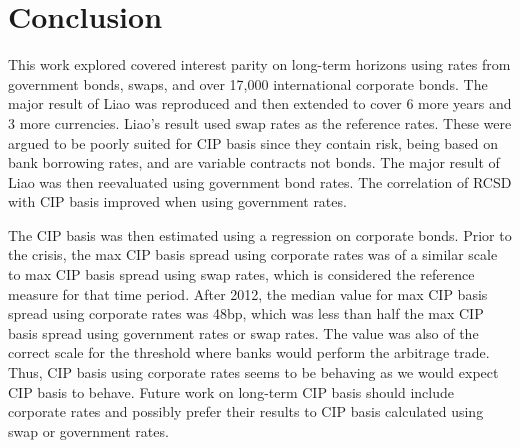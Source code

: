 


\section{Conclusion} \label{conclusion_chapter}

This work explored covered interest parity on long-term horizons using rates from government bonds, swaps, and over 17,000 international corporate bonds.  The major result of Liao\cite{Liao2016} was reproduced and then extended to cover 6 more years and 3 more currencies.  Liao's result used swap rates as the reference rates.  These were argued to be poorly suited for CIP basis since they contain risk, being based on bank borrowing rates, and are variable contracts not bonds.  The major result of Liao was then reevaluated using government bond rates.  The correlation of RCSD with CIP basis improved when using government rates.

The CIP basis was then estimated using a regression on corporate bonds.  Prior to the crisis, the max CIP basis spread using corporate rates was of a similar scale to max CIP basis spread using swap rates, which is considered the reference measure for that time period.   After 2012, the median value for max CIP basis spread using corporate rates was 48bp, which was less than half the max CIP basis spread using government rates or swap rates.  The value was also of the correct scale for the threshold where banks would perform the arbitrage trade.  Thus, CIP basis using corporate rates seems to be behaving as we would expect CIP basis to behave.  Future work on long-term CIP basis should include corporate rates and possibly prefer their results to CIP basis calculated using swap or government rates. 

